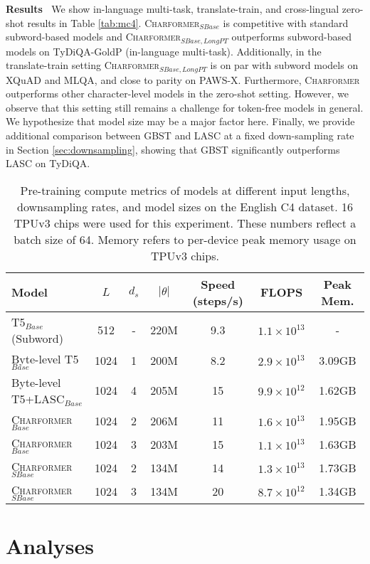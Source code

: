 \documentclass{article} \usepackage{iclr2022_conference,times}
\newcommand{\charformer}{\textsc{Charformer}\xspace}
\newcommand{\charformerbase}{\textsc{Charformer}$_{Base}$\xspace}
\newcommand{\charformertall}{\textsc{Charformer}$_{SBase}$\xspace}
\newcommand{\charformertalllong}{\textsc{Charformer}$_{SBase,LongPT}$\xspace}
\newcommand{\bytebase}{Byte-level T5$_{Base}$\xspace}
\newcommand{\caninebase}{Byte-level T5+LASC$_{Base}$\xspace}
\begin{document}
\noindent \textbf{Results} $\:$ We show in-language multi-task, translate-train, and cross-lingual zero-shot results in Table \ref{tab:mc4}. \charformertall is competitive with standard subword-based models and \charformertalllong outperforms subword-based models on TyDiQA-GoldP (in-language multi-task). Additionally, in the translate-train setting \charformertalllong is on par with subword models on XQuAD and MLQA, and close to parity on PAWS-X. Furthermore, \charformer outperforms other character-level models in the zero-shot setting. However, we observe that this setting still remains a challenge for token-free models in general. We hypothesize that model size may be a major factor here. Finally, we provide additional comparison between GBST and LASC at a fixed down-sampling rate in Section \ref{sec:downsampling}, showing that GBST significantly outperforms LASC on TyDiQA.  



\begin{table} \small
    \centering
    \caption{Pre-training compute metrics of models at different input lengths, downsampling rates, and model sizes on the English C4 dataset. 16 TPUv3 chips were used for this experiment. These numbers reflect a batch size of 64. Memory refers to per-device peak memory usage on TPUv3 chips. }
    \label{tab:perf}
    \begin{tabular}{l c c cccc}
    \toprule 
     Model & $L$ & $d_s$ & $|\theta|$  & Speed (steps/s) & FLOPS & Peak Mem.\\
     \midrule
T5$_{Base}$ (Subword) & 512 & - & 220M & 9.3 & $1.1 \times 10^{13}$ & - \\
\cmidrule{1-7}
\bytebase & 1024 & 1 & 200M& 8.2 & $2.9 \times 10^{13}$ &  3.09GB \\
      \caninebase & 1024 & 4 & 205M& 15 & $9.9 \times 10^{12}$ & 1.62GB\\
      \charformerbase & 1024  & 2 & 206M & 11  & $1.6 \times 10^{13}$ & 1.95GB\\
      \charformerbase & 1024  & 3 & 203M & 15 & $1.1 \times 10^{13}$ & 1.63GB\\
      \charformertall & 1024 & 2 & 134M & 14 & $1.3 \times 10^{13}$ &  1.73GB\\
       \charformertall & 1024 & 3 & 134M & 20 & $8.7 \times 10^{12}$ & 1.34GB
\\
      \bottomrule
\end{tabular}
\end{table}

\section{Analyses}
\end{document}

